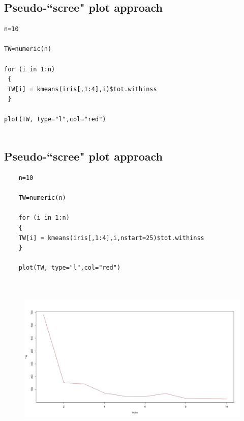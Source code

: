 \documentclass[12pt]{article}
\begin{document}
\subsection{Pseudo-``scree" plot approach}
\begin{framed}
\begin{verbatim}
n=10

TW=numeric(n)

for (i in 1:n)
 {
 TW[i] = kmeans(iris[,1:4],i)$tot.withinss
 }

plot(TW, type="l",col="red")


\end{verbatim}
\end{framed}
\subsection{Pseudo-``scree" plot approach}
\begin{framed}
	\begin{verbatim}
	n=10
	
	TW=numeric(n)
	
	for (i in 1:n)
	{
	TW[i] = kmeans(iris[,1:4],i,nstart=25)$tot.withinss
	}
	
	plot(TW, type="l",col="red")
	
	
	\end{verbatim}
\end{framed}
\begin{figure}[h!]
\centering
\includegraphics[width=1.1\linewidth]{./Scree}

\end{figure}
\end{document}
